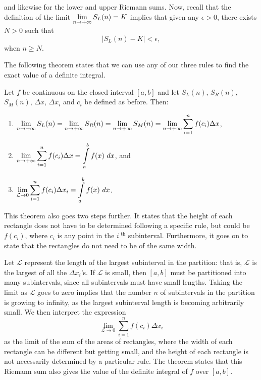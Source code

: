 and likewise for the lower and upper Riemann sums. Now, recall that the definition of the limit	$\displaystyle\lim_{n\to+\infty}S_L(n) = K$ implies that given any $\epsilon>0$, there exists $N>0$ such that 
		$$\left|S_L(n)-K\right| < \epsilon,$$
when $n\geq N$.

The following theorem states that we can use any of our three rules to find the exact value of a definite integral.

\begin{theorem}\label{thm:riemann_sum}
Let $f$ be continuous on the closed interval $[a,b]$  and let $S_L(n)$, $S_R(n)$, $S_M(n)$, $\Delta x$, $\Delta x_i$ and $c_i$ be defined as before. Then:
\begin{enumerate}
	\item		$\displaystyle \lim_{n\to+\infty} S_L(n) = \lim_{n\to+\infty} S_R(n) = \lim_{n\to+\infty} S_M(n) = \lim_{n\to+\infty}\sum_{i=1}^n f(c_i)\Delta x$, 
	
	\item		$\displaystyle \lim_{n\to+\infty}\sum_{i=1}^n f(c_i)\Delta x = \displaystyle\int\limits_a^b f(x)\ dx$, and %
	\item		$\ds \lim_{\mathcal{L}\to 0} \sum_{i=1}^n f(c_i)\Delta x_i = \ds\int\limits_a^b f(x)\ dx$.%
\end{enumerate}
\end{theorem}

This theorem also goes two steps further. It states that the height of each rectangle does not have to be determined following a specific rule, but could be $f(c_i)$, where $c_i$ is any point in the $i^\text{ th}$ subinterval. Furthermore, it goes on to state that the rectangles do not need to be of the same width. 

Let $\mathcal{L}$ represent the length of the largest subinterval in the partition: that is, $\mathcal{L}$ is the largest of all the $\Delta x_i$'s. If $\mathcal{L}$ is small, then $[a,b]$ must be partitioned into many subintervals, since all subintervals must have small lengths. Taking the limit as $\mathcal{L}$ goes to zero implies that the number $n$ of subintervals in the partition is growing to infinity, as the largest subinterval length is becoming arbitrarily small. We then interpret the expression 
$$\lim_{\mathcal{L}\to 0}\sum_{i=1}^nf(c_i)\Delta x_i$$
as the limit of the sum of the areas of rectangles, where the width of each rectangle can be different but getting small, and the height of each rectangle is not necessarily determined by a particular rule. The theorem states that this Riemann sum also gives the value of the definite integral of $f$ over $[a,b]$.



